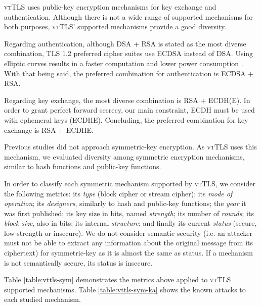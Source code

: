 \documentclass{sig-alternate-05-2015}
\begin{document}
\textsc{vtTLS} uses public-key encryption mechanisms for key exchange and authentication. Although there is not a wide range of supported mechanisms for both purposes, \textsc{vtTLS}' supported mechanisms provide a good diversity.

Regarding authentication, although DSA + RSA is stated as the most diverse combination, TLS 1.2 preferred cipher suites use ECDSA instead of DSA. Using elliptic curves results in a faster computation and lower power consumption \cite{Gupta02}. With that being said, the preferred combination for authentication is ECDSA + RSA.

Regarding key exchange, the most diverse combination is RSA + ECDH(E). In order to grant perfect forward secrecy, our main constraint, ECDH must be used with ephemeral keys (ECDHE). Concluding, the preferred combination for key exchange is RSA + ECDHE.




Previous studies did not approach sym\-metric-key encryption. As \textsc{vtTLS} uses this mechanism, we evaluated diversity among symmetric encryption mechanisms, similar to hash functions and public-key functions.

In order to classify each symmetric mechanism supported by \textsc{vtTLS}, we consider the following metrics: its \textit{type} (block cipher or stream cipher); its \textit{mode of operation}; its \textit{designers}, similarly to hash and public-key functions; the \textit{year} it was first published; its key size in bits, named \textit{strength}; its number of \textit{rounds}; its \textit{block size}, also in bits; its internal \textit{structure}; and finally its current \textit{status} (secure, low strength or insecure). We do not consider semantic security (i.e. an attacker must not be able to extract any information about the original message from its ciphertext) for symmetric-key as it is almost the same as status. If a mechanism is not semantically secure, its status is insecure.

Table \ref{table:vttls-sym} demonstrates the metrics above applied to \textsc{vtTLS} supported mechanisms. Table \ref{table:vttls-sym-ka} shows the known attacks to each studied mechanism.
\end{document}
